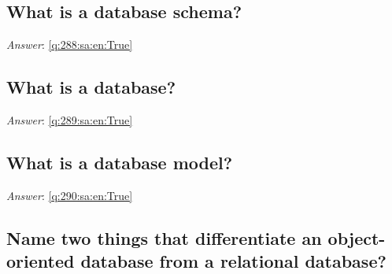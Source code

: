 \documentclass[a4paper,11pt,oneside]{article}
\begin{document}
\begin{sloppypar}
\subsection{What is a database schema?}

\label{q:288:sa:en:False}

\vspace{2cm}

\noindent\makebox[\textwidth]{\hrulefill}

\vspace{1cm}

\textit{Answer}: \autoref{q:288:sa:en:True}



\subsection{What is a database?}

\label{q:289:sa:en:False}

\vspace{2cm}

\noindent\makebox[\textwidth]{\hrulefill}

\vspace{1cm}

\textit{Answer}: \autoref{q:289:sa:en:True}



\subsection{What is a database model?}

\label{q:290:sa:en:False}

\vspace{2cm}

\noindent\makebox[\textwidth]{\hrulefill}

\vspace{1cm}

\textit{Answer}: \autoref{q:290:sa:en:True}



\subsection{Name two things that differentiate an object-oriented database from a relational database?}

\label{q:291:sa:en:False}

\vspace{2cm}

\noindent\makebox[\textwidth]{\hrulefill}


\end{sloppypar}
\end{document}
